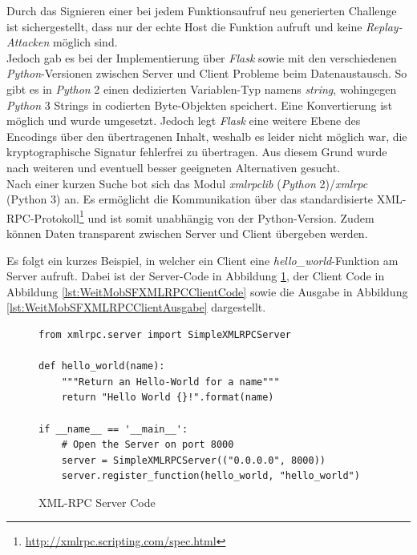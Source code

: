 

Durch das Signieren einer bei jedem Funktionsaufruf neu generierten Challenge ist sichergestellt, dass nur der echte Host die Funktion aufruft und keine \textit{Replay-Attacken} möglich sind.\\

Jedoch gab es bei der Implementierung über \textit{Flask} sowie mit den verschiedenen \textit{Python}-Versionen zwischen Server und Client Probleme beim Datenaustausch. So gibt es in \textit{Python} 2 einen dedizierten Variablen-Typ namens \textit{string}, wohingegen \textit{Python} 3 Strings in codierten Byte-Objekten speichert. Eine Konvertierung ist möglich und wurde umgesetzt. Jedoch legt \textit{Flask} eine weitere Ebene des Encodings über den übertragenen Inhalt, weshalb es leider nicht möglich war, die kryptographische Signatur fehlerfrei zu übertragen. Aus diesem Grund wurde nach weiteren und eventuell besser geeigneten Alternativen gesucht.\\

Nach einer kurzen Suche bot sich das Modul \textit{xmlrpclib} (\textit{Python} 2)/\textit{xmlrpc} (Python 3) an. Es ermöglicht die Kommunikation über das standardisierte XML-RPC-Protokoll\footnote{\url{http://xmlrpc.scripting.com/spec.html}} und ist somit unabhängig von der Python-Version. Zudem können Daten transparent zwischen Server und Client übergeben werden.

Es folgt ein kurzes Beispiel, in welcher ein Client eine \textit{hello\_world}-Funktion am Server aufruft. Dabei ist der Server-Code in Abbildung \ref{lst:WeitMobSFXMLRPCServerCode}, der Client Code in Abbildung \ref{lst:WeitMobSFXMLRPCClientCode} sowie die Ausgabe in Abbildung \ref{lst:WeitMobSFXMLRPCClientAusgabe} dargestellt.\\

\begin{figure}
\begin{lstlisting}
from xmlrpc.server import SimpleXMLRPCServer

def hello_world(name):
	"""Return an Hello-World for a name"""
    return "Hello World {}!".format(name)

if __name__ == '__main__':
	# Open the Server on port 8000
    server = SimpleXMLRPCServer(("0.0.0.0", 8000))
    server.register_function(hello_world, "hello_world")
\end{lstlisting}
\caption{XML-RPC Server Code}
\label{lst:WeitMobSFXMLRPCServerCode}
\end{figure}

